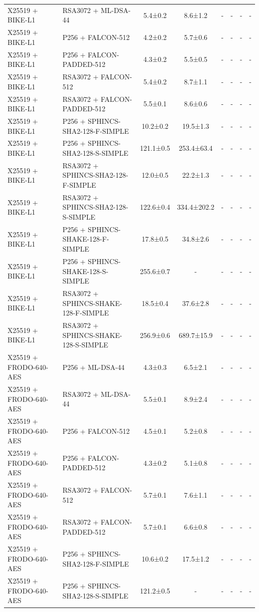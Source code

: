 \documentclass[10pt]{article}
\begin{document}
\begin{tabular}{@{}l l c c c c c c@{}}
X25519 + BIKE-L1 & RSA3072 + ML-DSA-44 & 5.4±0.2 & 8.6±1.2 & - & - & - & - \\
X25519 + BIKE-L1 & P256 + FALCON-512 & 4.2±0.2 & 5.7±0.6 & - & - & - & - \\
X25519 + BIKE-L1 & P256 + FALCON-PADDED-512 & 4.3±0.2 & 5.5±0.5 & - & - & - & - \\
X25519 + BIKE-L1 & RSA3072 + FALCON-512 & 5.4±0.2 & 8.7±1.1 & - & - & - & - \\
X25519 + BIKE-L1 & RSA3072 + FALCON-PADDED-512 & 5.5±0.1 & 8.6±0.6 & - & - & - & - \\
X25519 + BIKE-L1 & P256 + SPHINCS-SHA2-128-F-SIMPLE & 10.2±0.2 & 19.5±1.3 & - & - & - & - \\
X25519 + BIKE-L1 & P256 + SPHINCS-SHA2-128-S-SIMPLE & 121.1±0.5 & 253.4±63.4 & - & - & - & - \\
X25519 + BIKE-L1 & RSA3072 + SPHINCS-SHA2-128-F-SIMPLE & 12.0±0.5 & 22.2±1.3 & - & - & - & - \\
X25519 + BIKE-L1 & RSA3072 + SPHINCS-SHA2-128-S-SIMPLE & 122.6±0.4 & 334.4±202.2 & - & - & - & - \\
X25519 + BIKE-L1 & P256 + SPHINCS-SHAKE-128-F-SIMPLE & 17.8±0.5 & 34.8±2.6 & - & - & - & - \\
X25519 + BIKE-L1 & P256 + SPHINCS-SHAKE-128-S-SIMPLE & 255.6±0.7 & - & - & - & - & - \\
X25519 + BIKE-L1 & RSA3072 + SPHINCS-SHAKE-128-F-SIMPLE & 18.5±0.4 & 37.6±2.8 & - & - & - & - \\
X25519 + BIKE-L1 & RSA3072 + SPHINCS-SHAKE-128-S-SIMPLE & 256.9±0.6 & 689.7±15.9 & - & - & - & - \\
X25519 + FRODO-640-AES & P256 + ML-DSA-44 & 4.3±0.3 & 6.5±2.1 & - & - & - & - \\
X25519 + FRODO-640-AES & RSA3072 + ML-DSA-44 & 5.5±0.1 & 8.9±2.4 & - & - & - & - \\
X25519 + FRODO-640-AES & P256 + FALCON-512 & 4.5±0.1 & 5.2±0.8 & - & - & - & - \\
X25519 + FRODO-640-AES & P256 + FALCON-PADDED-512 & 4.3±0.2 & 5.1±0.8 & - & - & - & - \\
X25519 + FRODO-640-AES & RSA3072 + FALCON-512 & 5.7±0.1 & 7.6±1.1 & - & - & - & - \\
X25519 + FRODO-640-AES & RSA3072 + FALCON-PADDED-512 & 5.7±0.1 & 6.6±0.8 & - & - & - & - \\
X25519 + FRODO-640-AES & P256 + SPHINCS-SHA2-128-F-SIMPLE & 10.6±0.2 & 17.5±1.2 & - & - & - & - \\
X25519 + FRODO-640-AES & P256 + SPHINCS-SHA2-128-S-SIMPLE & 121.2±0.5 & - & - & - & - & - \\

\end{tabular}
\end{document}
